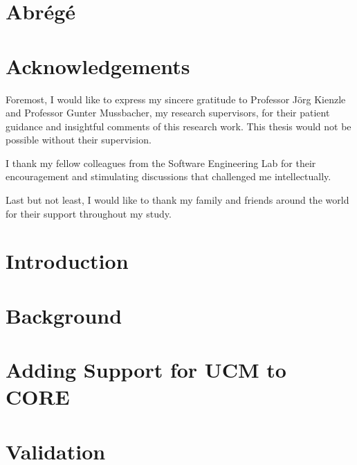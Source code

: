 \documentclass[12pt,letterpaper]{report}
\begin{document}
	\clearpage
	
	\chapter*{Abrégé}
	
	
	
	\clearpage
	
	\chapter*{Acknowledgements}
	
	Foremost, I would like to express my sincere gratitude to Professor Jörg Kienzle and Professor Gunter Mussbacher, my research supervisors, for their patient guidance and insightful comments of this research work. This thesis would not be possible without their supervision.
	
	I thank my fellow colleagues from the Software Engineering Lab for their encouragement and stimulating discussions that challenged me intellectually.
	
	Last but not least, I would like to thank my family and friends around the world for their support throughout my study.
	
	\renewcommand{\contentsname}{Table of Contents}
	\tableofcontents
	\listoffigures
	\listofalgorithms
	
	\clearpage
	
	\chapter{Introduction}
	
	
	\chapter{Background} \label{ch:2}
	
	
	\chapter{Adding Support for UCM to CORE} \label{ch:3}
	
	
	\chapter{Validation} \label{ch:4}
	
	
\end{document}
